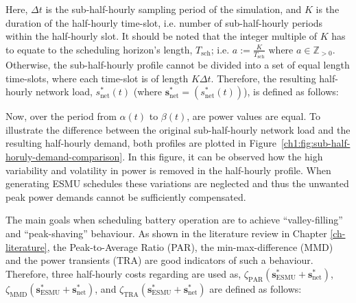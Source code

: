 Here, $\Delta t$ is the sub-half-hourly sampling period of the simulation, and $K$ is the duration of the half-hourly time-slot, i.e. number of sub-half-hourly periods within the half-hourly slot.
It should be noted that the integer multiple of $K$ has to equate to the scheduling horizon's length, $T_\text{sch}$; i.e. $a := \frac{K}{T_\text{sch}} \text{ where } a \in \mathbb{Z}_{>0}$.
Otherwise, the sub-half-hourly profile cannot be divided into a set of equal length time-slots, where each time-slot is of length $K\Delta t$.
Therefore, the resulting half-hourly network load, $s^{*}_\text{net}(t)$ (where $\textbf{s}^*_\text{net} = (s^*_\text{net}(t))$), is defined as follows:



Now, over the period from $\alpha(t)$ to $\beta(t)$, are power values are equal.
To illustrate the difference between the original sub-half-hourly network load and the resulting half-hourly demand, both profiles are plotted in Figure~\ref{ch1:fig:sub-half-horuly-demand-comparison}.
In this figure, it can be observed how the high variability and volatility in power is removed in the half-hourly profile.
When generating ESMU schedules these variations are neglected and thus the unwanted peak power demands cannot be sufficiently compensated.



The main goals when scheduling battery operation are to achieve ``valley-filling'' and ``peak-shaving'' behaviour.
As shown in the literature review in Chapter \ref{ch-literature}, the Peak-to-Average Ratio (PAR), the min-max-difference (MMD) and the power transients (TRA) are good indicators of such a behaviour.
Therefore, three half-hourly costs regarding are used as, $\zeta_\text{PAR}(\textbf{s}^*_\text{ESMU} + \textbf{s}^*_\text{net})$, $\zeta_\text{MMD}(\textbf{s}^*_\text{ESMU} + \textbf{s}^*_\text{net})$, and $\zeta_\text{TRA}(\textbf{s}^*_\text{ESMU} + \textbf{s}^*_\text{net})$ are defined as follows:








